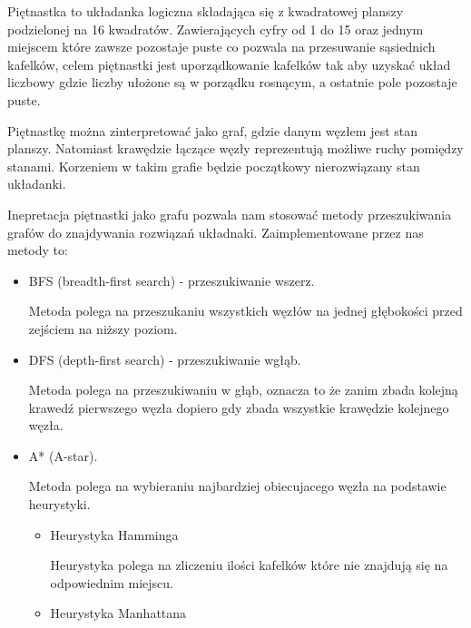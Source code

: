 \documentclass{classrep}
\begin{document}
    {

     Piętnastka to układanka logiczna składająca się z kwadratowej
        planszy podzielonej na 16 kwadratów. Zawierających cyfry od 1 do 15 oraz jednym miejscem które zawsze pozostaje puste
        co pozwala na przesuwanie sąsiednich kafelków, celem piętnastki jest uporządkowanie kafelków tak aby uzyskać układ liczbowy
        gdzie liczby ułożone są w porządku rosnącym, a ostatnie pole pozostaje puste.




        Piętnastkę można zinterpretować jako graf, gdzie danym węzłem jest stan planszy. Natomiast krawędzie łączące węzły
    reprezentują możliwe ruchy pomiędzy stanami. Korzeniem w takim grafie będzie początkowy nierozwiązany stan układanki.

    Inepretacja piętnastki jako grafu pozwala nam stosować metody przeszukiwania grafów do znajdywania rozwiązań układnaki.
    Zaimplementowane przez nas metody to:
        \begin{itemize}
            \item BFS (breadth-first search) - przeszukiwanie wszerz.

            Metoda polega na przeszukaniu wszystkich węzłów na jednej głębokości przed zejściem na niższy poziom.
            \item DFS (depth-first search) - przeszukiwanie wgłąb.

            Metoda polega na przeszukiwaniu w głąb, oznacza to że zanim zbada kolejną krawedź pierwszego węzła
            dopiero gdy zbada wszystkie krawędzie kolejnego węzła.
            \item A* (A-star).

            Metoda polega na wybieraniu najbardziej obiecujacego węzła na podstawie heurystyki.
            \begin{itemize}
                \item Heurystyka Hamminga

                Heurystyka polega na zliczeniu ilości kafelków które nie znajdują się na odpowiednim miejscu.
                \item Heurystyka Manhattana


\end{itemize}
\end{itemize}}
\end{document}
